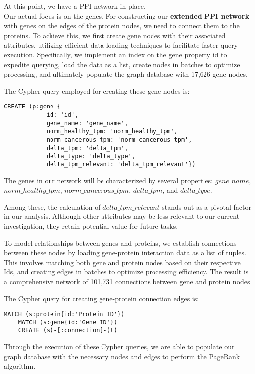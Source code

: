 At this point, we have a PPI network in place. \\


Our actual focus is on the genes.
For constructing our \textbf{extended PPI network} with genes on the edges of the protein nodes, we need to connect them to the proteins.
To achieve this, we first create gene nodes with their associated attributes,
utilizing efficient data loading techniques to facilitate faster query execution.
Specifically, we implement an index on the gene property id to expedite querying,
load the data as a list, create nodes in batches to optimize processing,
and ultimately populate the graph database with 17,626 gene nodes.

The Cypher query employed for creating these gene nodes is:
\begin{lstlisting}[language=Cypher, label={lst:gene_nodes}]
    CREATE (p:gene {
            id: 'id',
            gene_name: 'gene_name',
            norm_healthy_tpm: 'norm_healthy_tpm',
            norm_cancerous_tpm: 'norm_cancerous_tpm',
            delta_tpm: 'delta_tpm',
            delta_type: 'delta_type',
            delta_tpm_relevant: 'delta_tpm_relevant'})
\end{lstlisting}

The genes in our network will be characterized by several properties:
$gene\_name$, $norm\_healthy\_tpm$, $norm\_cancerous\_tpm$, $delta\_tpm$, and $delta\_type$.


Among these, the calculation of $delta\_tpm\_relevant$ stands out as a pivotal factor in our analysis.
Although other attributes may be less relevant to our current investigation, they retain potential value for future tasks.

To model relationships between genes and proteins,
we establish connections between these nodes by loading gene-protein interaction data as a list of tuples.
This involves matching both gene and protein nodes based on their respective Ids,
and creating edges in batches to optimize processing efficiency.
The result is a comprehensive network of 101,731 connections between gene and protein nodes

The Cypher query for creating gene-protein connection edges is:
\begin{lstlisting}[language=Cypher, label={lst:gene_protein_edges}]
    MATCH (s:protein{id:'Protein ID'})
    MATCH (s:gene{id:'Gene ID'})
    CREATE (s)-[:connection]-(t)
\end{lstlisting}

Through the execution of these Cypher queries,
we are able to populate our graph database with the necessary nodes and edges to perform the PageRank algorithm.\\